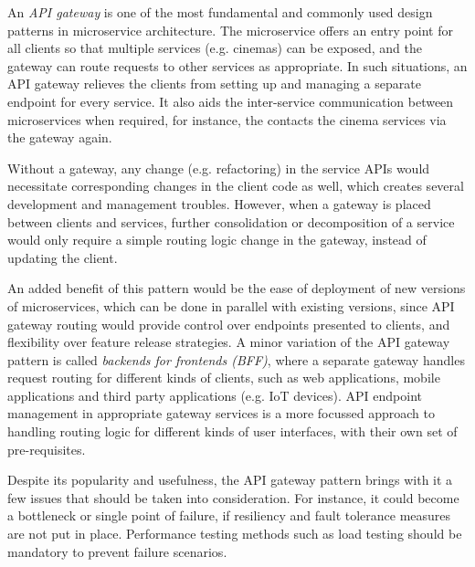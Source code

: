 An \textit{API gateway} is one of the most fundamental and commonly used design patterns in microservice architecture. The  microservice offers an entry point for all clients so that multiple services (e.g. cinemas) can be exposed, and the gateway can route requests to other services as appropriate. In such situations, an API gateway relieves the clients from setting up and managing a separate endpoint for every service. It also aids the inter-service communication between microservices when required, for instance, the  contacts the cinema services via the gateway again.

Without a gateway, any change (e.g. refactoring) in the service APIs would necessitate corresponding changes in the client code as well, which creates several development and management troubles. However, when a gateway is placed between clients and services, further consolidation or decomposition of a service would only require a simple routing logic change in the gateway, instead of updating the client.

An added benefit of this pattern would be the ease of deployment of new versions of microservices, which can be done in parallel with existing versions, since API gateway routing would provide control over endpoints presented to clients, and flexibility over feature release strategies. A minor variation of the API gateway pattern is called \textit{backends for frontends (BFF)}, where a separate gateway handles request routing for different kinds of clients, such as web applications, mobile applications and third party applications (e.g. IoT devices). API endpoint management in appropriate gateway services is a more focussed approach to handling routing logic for different kinds of user interfaces, with their own set of pre-requisites.

Despite its popularity and usefulness, the API gateway pattern brings with it a few issues that should be taken into consideration. For instance, it could become a bottleneck or single point of failure, if resiliency and fault tolerance measures are not put in place. Performance testing methods such as load testing should be mandatory to prevent failure scenarios.

